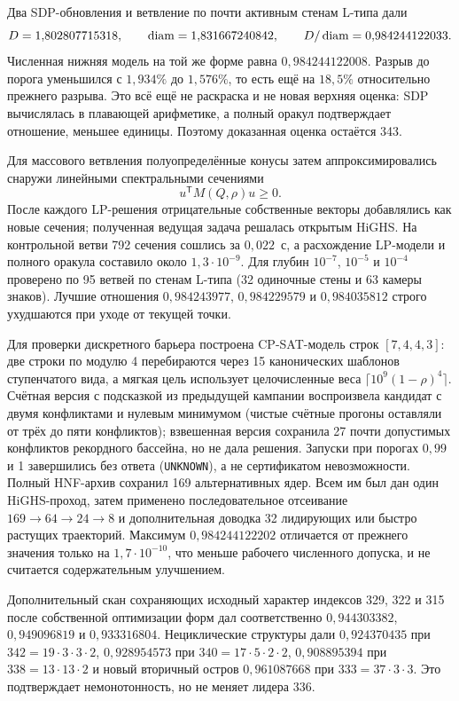 Два SDP-обновления и ветвление по почти активным стенам L-типа дали
\[
 D=1{,}802807715318,\qquad
 \operatorname{diam}=1{,}831667240842,\qquad
 D/\operatorname{diam}=0{,}984244122033.
\]
Численная нижняя модель на той же форме равна $0{,}984244122008$. Разрыв до
порога уменьшился с $1{,}934\%$ до $1{,}576\%$, то есть ещё на $18{,}5\%$
относительно прежнего разрыва. Это всё ещё не раскраска и не новая верхняя
оценка: SDP вычислялась в плавающей арифметике, а полный оракул подтверждает
отношение, меньшее единицы. Поэтому доказанная оценка остаётся 343.

Для массового ветвления полуопределённые конусы затем аппроксимировались
снаружи линейными спектральными сечениями
\[
  u^{\mathsf T}M(Q,\rho)u\ge0.
\]
После каждого LP-решения отрицательные собственные векторы добавлялись как
новые сечения; полученная ведущая задача решалась открытым HiGHS. На контрольной ветви
792 сечения сошлись за $0{,}022$~с, а расхождение LP-модели и полного оракула
составило около $1{,}3\cdot10^{-9}$. Для глубин $10^{-7}$, $10^{-5}$ и
$10^{-4}$ проверено по 95 ветвей по стенам L-типа (32 одиночные стены и 63 камеры
знаков). Лучшие отношения $0{,}984243977$, $0{,}984229579$ и
$0{,}984035812$ строго ухудшаются при уходе от текущей точки.

Для проверки дискретного барьера построена CP-SAT-модель строк
$[7,4,4,3]$: две строки по модулю 4 перебираются через 15 канонических
шаблонов ступенчатого вида, а мягкая цель использует целочисленные веса
$\lceil10^9(1-\rho)^4\rceil$. Счётная версия с подсказкой из предыдущей
кампании воспроизвела кандидат с двумя конфликтами и нулевым минимумом
(чистые счётные прогоны оставляли от трёх до пяти конфликтов); взвешенная
версия сохранила 27 почти допустимых конфликтов рекордного бассейна, но не
дала решения. Запуски при порогах $0{,}99$ и 1
завершились без ответа (\texttt{UNKNOWN}), а не сертификатом невозможности.
Полный HNF-архив сохранил 169 альтернативных ядер. Всем им был дан один
HiGHS-проход, затем применено последовательное отсеивание $169\to64\to24\to8$ и
дополнительная доводка 32 лидирующих или быстро растущих траекторий. Максимум
$0{,}984244122202$ отличается от прежнего значения только на
$1{,}7\cdot10^{-10}$, что меньше рабочего численного допуска, и не считается
содержательным улучшением.

Дополнительный скан сохраняющих исходный характер индексов 329, 322 и 315 после
собственной оптимизации форм дал соответственно $0{,}944303382$,
$0{,}949096819$ и $0{,}933316804$. Нециклические структуры дали
$0{,}924370435$ при $342=19\cdot3\cdot3\cdot2$,
$0{,}928954573$ при $340=17\cdot5\cdot2\cdot2$,
$0{,}908895394$ при $338=13\cdot13\cdot2$ и новый вторичный остров
$0{,}961087668$ при $333=37\cdot3\cdot3$. Это подтверждает немонотонность,
но не меняет лидера 336.

